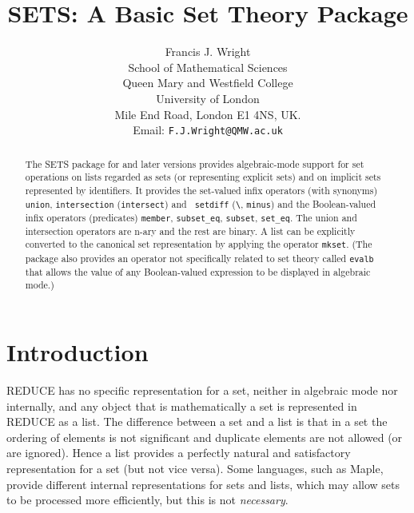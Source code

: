 
\title{SETS: A Basic Set Theory Package}

\author{Francis J. Wright \\
School of Mathematical Sciences \\
Queen Mary and Westfield College \\
University of London \\
Mile End Road, London E1 4NS, UK. \\
Email: {\tt F.J.Wright@QMW.ac.uk}}


\maketitle

\begin{abstract}
  The SETS package for  and later versions provides
  algebraic-mode support for set operations on lists regarded as sets
  (or representing explicit sets) and on implicit sets represented by
  identifiers.  It provides the set-valued infix operators (with
  synonyms) {\tt union}, {\tt intersection} ({\tt intersect}) and {\tt
  setdiff} (\verb|\|, {\tt minus}) and the Boolean-valued infix
  operators (predicates) {\tt member}, {\tt subset\_eq}, {\tt subset},
  {\tt set\_eq}.  The union and intersection operators are n-ary and
  the rest are binary.  A list can be explicitly converted to the
  canonical set representation by applying the operator {\tt mkset}.
  (The package also provides an operator not specifically related to
  set theory called {\tt evalb} that allows the value of any
  Boolean-valued expression to be displayed in algebraic mode.)
\end{abstract}


\section{Introduction}

REDUCE has no specific representation for a set, neither in algebraic
mode nor internally, and any object that is mathematically a set is
represented in REDUCE as a list.  The difference between a set and a
list is that in a set the ordering of elements is not significant and
duplicate elements are not allowed (or are ignored).  Hence a list
provides a perfectly natural and satisfactory representation for a set
(but not vice versa).  Some languages, such as Maple, provide
different internal representations for sets and lists, which may allow
sets to be processed more efficiently, but this is not {\em
necessary}.

